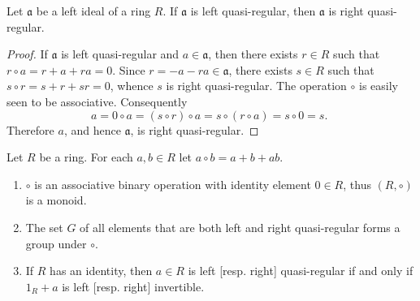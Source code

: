 \begin{lemma}
    \label{lem: left quasi-regular left ideal is right quasi-regular.}
    Let $\mathfrak{a}$ be a left ideal of a ring $R$.
    If $\mathfrak{a}$ is left quasi-regular, then $\mathfrak{a}$ is right quasi-regular.
    \begin{proof}
        If $\mathfrak{a}$ is left quasi-regular and $a \in \mathfrak{a}$, then there exists $r \in R$ such that $r \circ a=r+a+r a=0$. Since $r=-a-r a \in \mathfrak{a}$, there exists $s \in R$ such that $s \circ r=s+r+s r=0$, whence $s$ is right quasi-regular. The operation $\circ$ is easily seen to be associative. Consequently
        \begin{equation*}
            a=0 \circ a=(s \circ r) \circ a=s \circ(r \circ a)=s \circ 0=s \text {. }
        \end{equation*}
        Therefore $a$, and hence $\mathfrak{a}$, is right quasi-regular.
    \end{proof}
\end{lemma}

\begin{proposition}
    Let $R$ be a ring. For each $a, b \in R$ let $a \circ b=a+b+a b$.
    \begin{enumerate}
        \item
              $\circ$ is an associative binary operation with identity element $0 \in R$, thus $\left(R,\circ\right)$ is a monoid.
        \item
              The set $G$ of all elements that are both left and right quasi-regular forms a group under $\circ$.
        \item
              If $R$ has an identity, then $a \in R$ is left [resp. right] quasi-regular if and only if $1_R+a$ is left [resp. right] invertible.
    \end{enumerate}
\end{proposition}




